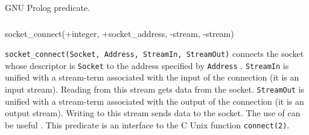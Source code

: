 \Portability

GNU Prolog predicate.

\subsubsection{\label{socket-connect/4}}

\begin{TemplatesOneCol}
socket\_connect(+integer, +socket\_address, -stream, -stream)

\end{TemplatesOneCol}

\Description

\texttt{socket\_connect(Socket, Address, StreamIn, StreamOut)} connects the
socket whose descriptor is \texttt{Socket} to the address specified by
\texttt{Address} . \texttt{StreamIn} is
unified with a stream-term associated with the input of the connection (it is
an input stream). Reading from this stream gets data from the socket.
\texttt{StreamOut} is unified with a stream-term associated with the output of
the connection (it is an output stream). Writing to this stream sends data
to the socket. The use of  can be useful
. This predicate is an interface to the C Unix function
\texttt{connect(2)}.

